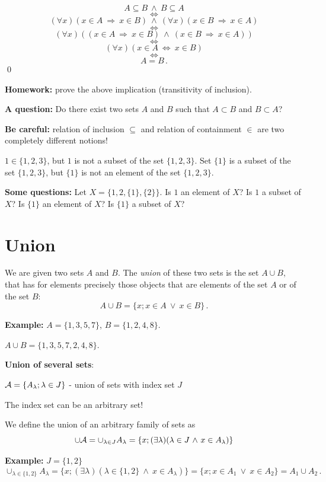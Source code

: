 \documentclass[11pt,paper=b5,footinclude,headinclude]{scrbook} %
\def\ali {{~\vee~}}
\def\inn {{~\wedge~}}
\def\sledi {{~\Rightarrow~}}
\def\cee {{~\Leftrightarrow~}}
\theoremstyle{remark}
\theoremstyle{definition} %
\theoremstyle{theorem} %
\begin{document}
$$A\subseteq B \inn B\subseteq A$$
$$\cee$$
$$(\forall x)(x\in A\sledi x\in B) \inn (\forall x)(x\in B\sledi x\in A)$$
$$\cee$$
$$(\forall x)((x\in A\sledi x\in B) \inn (x\in B\sledi x\in A))$$
$$\cee$$
$$(\forall x)(x\in A\cee x\in B)$$
$$\cee$$
$$A = B\,.$$\qed


\textbf{ Homework:} prove the above implication (transitivity of inclusion).

\medskip
\textbf{ A question:} Do there exist two sets $A$ and $B$ such that $A\subset B$ and $B\subset A$?

\bigskip
\textbf{ Be careful:} relation of inclusion $\subseteq$ and relation of containment $\in$ are two completely different
notions!

$1\in\{1,2,3\}$, but $1$ is not a subset of the set $\{1,2,3\}$.
Set $\{1\}$ is a subset of the set $\{1,2,3\}$, but
$\{1\}$ is not an element of the set $\{1,2,3\}$.

\medskip

\textbf{ Some questions:} Let $X = \{1,2,\{1\},\{2\}\}$.
Is $1$ an element of $X$?
Is $1$ a subset of $X$?
Is $\{1\}$ an element of $X$?
Is $\{1\}$ a subset of $X$?

\bigskip

\section{Union}
We are given two sets $A$ and $B$. The {\em union} of these two sets is the set $A\cup B$,
that has for elements precisely those objects that are elements of the set $A$ or of the set $B$:
$$A\cup B = \{x; x\in A \ali x\in B\}\,.$$

\textbf{ Example:}
$A = \{1,3,5,7\}$, $B = \{1,2,4,8\}$.

$A\cup B = \{1,3,5,7,2,4,8\}$.

\medskip

\textbf{ Union of several sets}:

${\cal A} = \{A_\lambda; \lambda \in J\}$ - union of sets with index set $J$

The index set can be an arbitrary set!

We define the union of an arbitrary family of sets as
$$\cup {\cal A} = \cup_{\lambda \in J} A_\lambda = \{x;(\exists \lambda) (\lambda \in J\inn x\in A_\lambda)\}$$

\medskip
\textbf{ Example:} $J = \{1,2\}$
$$\cup_{\lambda \in \{1,2\}} A_\lambda = \{x;(\exists \lambda) (\lambda \in \{1,2\}\inn x\in A_\lambda)\}= \{x;x\in A_1 \ali x\in A_2\} = A_1\cup A_2\,.$$
\end{document}
